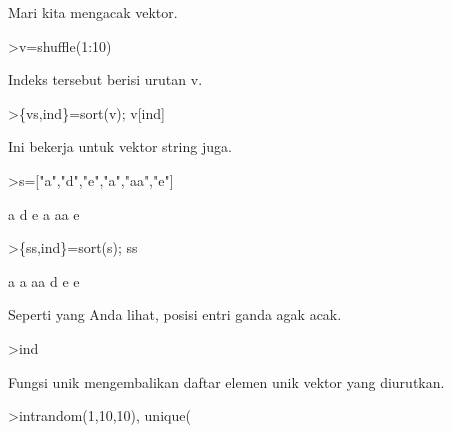 \documentclass[a4paper,10pt]{article}
\begin{document}
\begin{eulernotebook}
\begin{eulercomment}
\begin{eulercomment}
\begin{eulercomment}
\begin{eulercomment}
\begin{eulercomment}
\begin{eulercomment}
\begin{eulercomment}
Mari kita mengacak vektor.
\end{eulercomment}
\begin{eulerprompt}
>v=shuffle(1:10)
\end{eulerprompt}
\begin{euleroutput}
  [4,  5,  10,  6,  8,  9,  1,  7,  2,  3]
\end{euleroutput}
\begin{eulercomment}
Indeks tersebut berisi urutan v.
\end{eulercomment}
\begin{eulerprompt}
>\{vs,ind\}=sort(v); v[ind]
\end{eulerprompt}
\begin{euleroutput}
  [1,  2,  3,  4,  5,  6,  7,  8,  9,  10]
\end{euleroutput}
\begin{eulercomment}
Ini bekerja untuk vektor string juga.
\end{eulercomment}
\begin{eulerprompt}
>s=["a","d","e","a","aa","e"]
\end{eulerprompt}
\begin{euleroutput}
  a
  d
  e
  a
  aa
  e
\end{euleroutput}
\begin{eulerprompt}
>\{ss,ind\}=sort(s); ss
\end{eulerprompt}
\begin{euleroutput}
  a
  a
  aa
  d
  e
  e
\end{euleroutput}
\begin{eulercomment}
Seperti yang Anda lihat, posisi entri ganda agak acak.
\end{eulercomment}
\begin{eulerprompt}
>ind
\end{eulerprompt}
\begin{euleroutput}
  [4,  1,  5,  2,  6,  3]
\end{euleroutput}
\begin{eulercomment}
Fungsi unik mengembalikan daftar elemen unik vektor yang diurutkan.
\end{eulercomment}
\begin{eulerprompt}
>intrandom(1,10,10), unique(%
\end{eulerprompt}
\begin{euleroutput}
  [4,  4,  9,  2,  6,  5,  10,  6,  5,  1]
  [1,  2,  4,  5,  6,  9,  10]
\end{euleroutput}
\begin{eulercomment}

\end{eulercomment}
\end{eulercomment}
\end{eulercomment}
\end{eulercomment}
\end{eulercomment}
\end{eulercomment}
\end{eulercomment}
\end{eulernotebook}
\end{document}
